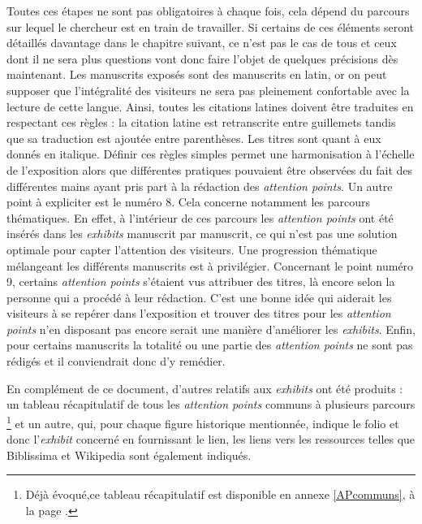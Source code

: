     Toutes ces étapes ne sont pas obligatoires à chaque fois, cela dépend du parcours sur lequel le chercheur est en train de travailler. Si certains de ces éléments seront détaillés davantage dans le chapitre suivant, ce n'est pas le cas de tous et ceux dont il ne sera plus questions vont donc faire l'objet de quelques précisions dès maintenant. Les manuscrits exposés sont des manuscrits en latin, or on peut supposer que l'intégralité des visiteurs ne sera pas pleinement confortable avec la lecture de cette langue. Ainsi, toutes les citations latines doivent être traduites en respectant ces règles : la citation latine est retranscrite entre guillemets tandis que sa traduction est ajoutée entre parenthèses. Les titres sont quant à eux donnés en italique. Définir ces règles simples permet une harmonisation à l'échelle de l'exposition alors que différentes pratiques pouvaient être observées du fait des différentes mains ayant pris part à la rédaction des \textit{attention points}. Un autre point à expliciter est le numéro 8. Cela concerne notamment les parcours thématiques. En effet, à l'intérieur de ces parcours les \textit{attention points} ont été insérés dans les \textit{exhibits} manuscrit par manuscrit, ce qui n'est pas une solution optimale pour capter l'attention des visiteurs. Une progression thématique mélangeant les différents manuscrits est à privilégier. Concernant le point numéro 9, certains \textit{attention points} s'étaient vus attribuer des titres, là encore selon la personne qui a procédé à leur rédaction. C'est une bonne idée qui aiderait les visiteurs à se repérer dans l'exposition et trouver des titres pour les \textit{attention points} n'en disposant pas encore serait une manière d'améliorer les \textit{exhibits}. Enfin, pour certains manuscrits la totalité ou une partie des \textit{attention points} ne sont pas rédigés et il conviendrait donc d'y remédier.

    En complément de ce document, d'autres relatifs aux \textit{exhibits} ont été produits : un tableau récapitulatif de tous les \textit{attention points} communs à plusieurs parcours \footnote{Déjà évoqué,ce tableau récapitulatif est disponible en annexe \ref{APcommuns}, à la page \pageref{APcommuns}.} et un autre, qui, pour chaque figure historique mentionnée, indique le folio et donc l'\textit{exhibit} concerné en fournissant le lien, les liens vers les ressources telles que Biblissima et Wikipedia sont également indiqués.

